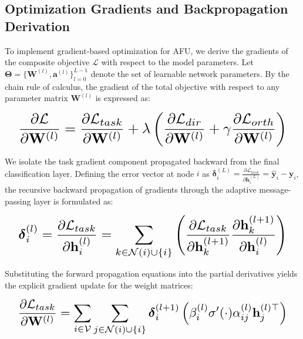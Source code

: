 \documentclass[10pt,twocolumn]{article}
\begin{document}
\subsection{Optimization Gradients and Backpropagation Derivation}

To implement gradient-based optimization for \textsc{AFU}, we derive the gradients of the composite objective $\mathcal{L}$ with respect to the model parameters. Let $\boldsymbol{\Theta} = \{\mathbf{W}^{(l)}, \mathbf{a}^{(l)}\}_{l=0}^{L-1}$ denote the set of learnable network parameters. By the chain rule of calculus, the gradient of the total objective with respect to any parameter matrix $\mathbf{W}^{(l)}$ is expressed as:

\begin{equation}
\resizebox{0.95\columnwidth}{!}{\ensuremath{\displaystyle \frac{\partial \mathcal{L}}{\partial \mathbf{W}^{(l)}} = \frac{\partial \mathcal{L}_{task}}{\partial \mathbf{W}^{(l)}} + \lambda \left( \frac{\partial \mathcal{L}_{dir}}{\partial \mathbf{W}^{(l)}} + \gamma \frac{\partial \mathcal{L}_{orth}}{\partial \mathbf{W}^{(l)}} \right)}}
\end{equation}

We isolate the task gradient component propagated backward from the final classification layer. Defining the error vector at node $i$ as $\boldsymbol{\delta}_i^{(L)} = \frac{\partial \mathcal{L}_{task}}{\partial \mathbf{h}_i^{(L)}} = \hat{\mathbf{y}}_i - \mathbf{y}_i$, the recursive backward propagation of gradients through the adaptive message-passing layer is formulated as:

\begin{equation}
\resizebox{0.95\columnwidth}{!}{\ensuremath{\displaystyle \boldsymbol{\delta}_i^{(l)} = \frac{\partial \mathcal{L}_{task}}{\partial \mathbf{h}_i^{(l)}} = \sum_{k \in \mathcal{N}(i) \cup \{i\}} \left( \frac{\partial \mathcal{L}_{task}}{\partial \mathbf{h}_k^{(l+1)}} \frac{\partial \mathbf{h}_k^{(l+1)}}{\partial \mathbf{h}_i^{(l)}} \right)}}
\end{equation}

Substituting the forward propagation equations into the partial derivatives yields the explicit gradient update for the weight matrices:

\begin{equation}
\resizebox{0.95\columnwidth}{!}{\ensuremath{\displaystyle \frac{\partial \mathcal{L}_{task}}{\partial \mathbf{W}^{(l)}} = \sum_{i \in \mathcal{V}} \sum_{j \in \mathcal{N}(i) \cup \{i\}} \boldsymbol{\delta}_i^{(l+1)} \left( \beta_i^{(l)} \sigma'(\cdot) \alpha_{ij}^{(l)} \mathbf{h}_j^{(l)\top} \right)}}
\end{equation}
\end{document}
